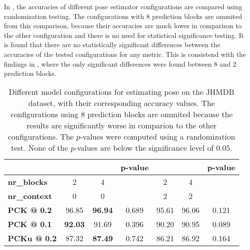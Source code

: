 In , the accuracies of different pose estimator configurations are compared using randomization testing.
The configurations with $8$ prediction blocks are ommited from this comparison, because their accuracies are much lower in comparison to the other configuration and there is no need for statistical significance testing.
It is found that there are no statistically significant differences between the accuracies of the tested configurations for any metric.
This is consistend with the findings in , where the only significant differences were found between $8$ and $2$ prediction blocks.

\begin{table}[]
    \small
    \centering
    \begin{tabular}{|l|c|c|c||c|c|c|}
        \hline
            & & & \textbf{p-value} & & & \textbf{p-value} \\ \hline
            \textbf{nr\_blocks} & 2 & 4 &  & 2 & 4 &  \\ \hline
            \textbf{nr\_context} & 0 & 0 & & 2 & 2 & \\ \hline
            \textbf{PCK @ 0.2} & 96.85 & \textbf{96.94} & 0.689 & 95.61 & 96.06 & 0.121 \\ \hline
            \textbf{PCK @ 0.1} & \textbf{92.03} & 91.69 & 0.396 & 90.20 & 90.95 & 0.089 \\ \hline
            \textbf{PCKu @ 0.2} & 87.32 & \textbf{87.49} & 0.742 & 86.21 & 86.92 & 0.164 \\ \hline
        \end{tabular}
    \caption{Different model configurations for estimating pose on the JHMDB dataset, with their corresponding accuracy values. The configurations using $8$ prediction blocks are ommited because the results are significantly worse in comparion to the other configurations. The $p$-values were computed using a randomization test. None of the $p$-values are below the significance level of $0.05$.}
    \label{tab:jhmdb_results_confidence}
\end{table}

